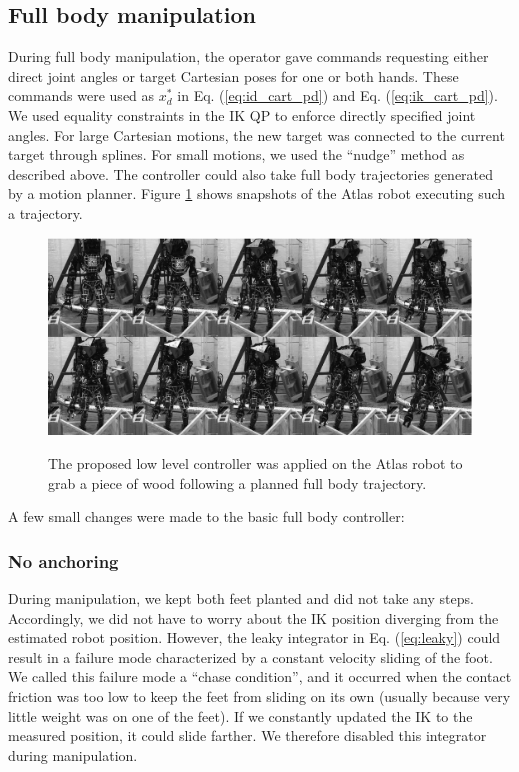\documentclass{ws-ijhr}
\newcommand{\eref}[1] {Eq. (\ref{#1})}
\newcommand{\fref}[1] {Figure \ref{#1}}
\begin{document}
\subsection{Full body manipulation}
During full body manipulation, the operator gave commands requesting either 
direct joint angles or target Cartesian poses for one or both hands. 
These commands were used as $x^*_d$ in \eref{eq:id_cart_pd} and \eref{eq:ik_cart_pd}.
We used equality constraints in the IK QP to enforce directly specified joint angles. 
For large Cartesian motions, the new target was connected to the current target
through splines. 
For small motions, we used the ``nudge'' method as described above. 
The controller could also take full body trajectories generated by a motion planner.
\fref{fig:manip} shows snapshots of the Atlas robot executing such a trajectory.

\begin{figure} 
  \begin{center}
    {\includegraphics[width=1\textwidth]{images/debris.eps}}
    \caption{The proposed low level controller was applied on the Atlas robot 
      to grab a piece of wood following a planned full body trajectory.}
			\label{fig:manip}
  \end{center}
\end{figure}  
 
A few small changes were made to the basic full body controller:
\subsubsection{No anchoring}
During manipulation, we kept both feet planted and did not take any steps. 
Accordingly, we did not have to worry about the IK position diverging from the 
estimated robot position. 
However, the leaky integrator in \eref{eq:leaky} could result in a failure mode 
characterized by a constant velocity sliding of the foot. 
We called this failure mode a ``chase condition'', and it occurred when 
the contact friction was too low to keep the feet from sliding on its own 
(usually because very little weight was on one of the feet). 
If we constantly updated the IK to the measured position, it could slide farther. 
We therefore disabled this integrator during manipulation.
\label{sec:chase_condition}
\end{document}
